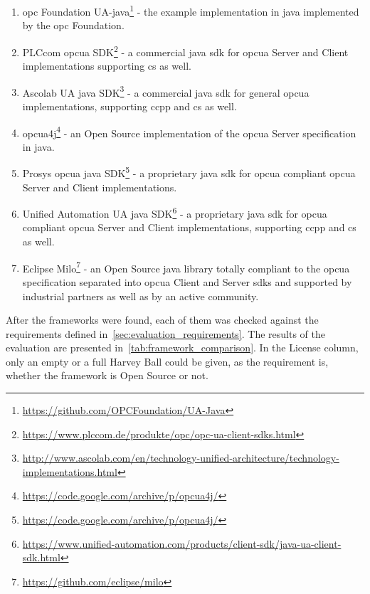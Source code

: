 \documentclass[
a4paper,
twoside,
headsepline,
cleardoublepage=empty,
parskip=half,
draft=false
]{scrbook}
\begin{document}
			\begin{enumerate}
				
				\item \gls{opc} Foundation UA-\gls{java}\footnote{\url{https://github.com/OPCFoundation/UA-Java}} - the example implementation in \gls{java} implemented by the \gls{opc} Foundation.
				
				\item PLCcom \gls{opcua} SDK\footnote{\url{https://www.plccom.de/produkte/opc/opc-ua-client-sdks.html}} - a commercial \gls{java} \gls{sdk} for \gls{opcua} Server and Client implementations supporting \gls{cs} as well.
				
				\item Ascolab UA \gls{java} SDK\footnote{\url{http://www.ascolab.com/en/technology-unified-architecture/technology-implementations.html}} - a commercial \gls{java} \gls{sdk} for general \gls{opcua} implementations, supporting \gls{ccpp} and \gls{cs} as well.
				
				\item opcua4j\footnote{\url{https://code.google.com/archive/p/opcua4j/}} - an Open Source implementation of the \gls{opcua} Server specification in \gls{java}.
				
				\item Prosys \gls{opcua} \gls{java} SDK\footnote{\url{https://code.google.com/archive/p/opcua4j/}} - a proprietary \gls{java} \gls{sdk} for \gls{opcua} compliant \gls{opcua} Server and Client implementations.
				
				\item Unified Automation UA \gls{java} SDK\footnote{\url{https://www.unified-automation.com/products/client-sdk/java-ua-client-sdk.html}} - a proprietary \gls{java} \gls{sdk} for \gls{opcua} compliant \gls{opcua} Server and Client implementations, supporting \gls{ccpp} and \gls{cs} as well.
				
				\item Eclipse Milo\footnote{\url{https://github.com/eclipse/milo}} - an Open Source \gls{java} library totally compliant to the \gls{opcua} specification separated into \gls{opcua} Client and Server \gls{sdk}s and supported by industrial partners as well as by an active community.
				
			\end{enumerate}
			
			After the frameworks were found, each of them was checked against the requirements defined in~\cref{sec:evaluation_requirements}. The results of the evaluation are presented in~\cref{tab:framework_comparison}. In the License column, only an empty or a full Harvey Ball could be given, as the requirement is, whether the framework is Open Source or not.
			
\end{document}
